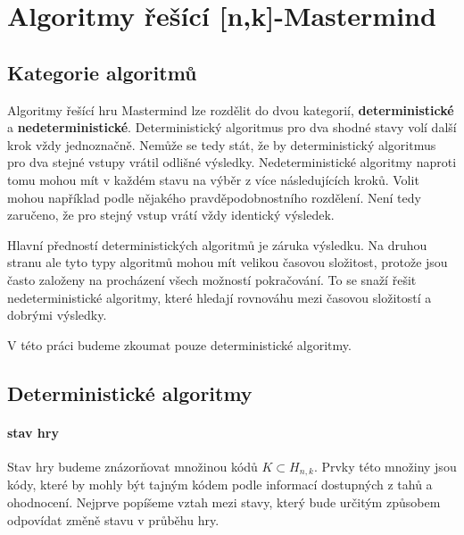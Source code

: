 \chapter{Algoritmy řešící [n,k]-Mastermind}

\section{Kategorie algoritmů}
Algoritmy řešící hru Mastermind lze rozdělit do dvou kategorií, \textbf{deterministické} a \textbf{nedeterministické}. Deterministický algoritmus pro dva shodné stavy volí další krok vždy jednoznačně. Nemůže se tedy stát, že by deterministický algoritmus pro dva stejné vstupy vrátil odlišné výsledky. Nedeterministické algoritmy naproti tomu mohou mít v každém stavu na výběr z více následujících kroků. Volit mohou například podle nějakého pravděpodobnostního rozdělení. Není tedy zaručeno, že pro stejný vstup vrátí vždy identický výsledek.

Hlavní předností deterministických algoritmů je záruka výsledku. Na druhou stranu ale tyto typy algoritmů mohou mít velikou časovou složitost, protože jsou často založeny na procházení všech možností pokračování. To se snaží řešit nedeterministické algoritmy, které hledají rovnováhu mezi časovou složitostí a dobrými výsledky. 

V této práci budeme zkoumat pouze deterministické algoritmy. 



\section{Deterministické algoritmy}

\subsubsection{stav hry}

Stav hry budeme znázorňovat množinou kódů $K \subset H_{n,k}$. Prvky této množiny jsou kódy, které by mohly být tajným kódem podle informací dostupných z tahů a ohodnocení. Nejprve popíšeme vztah mezi stavy, který bude určitým způsobem odpovídat změně stavu v průběhu hry. 

